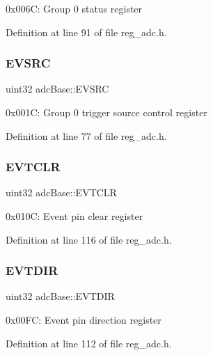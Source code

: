 0x006C\+: Group 0 status register 

Definition at line 91 of file reg\+\_\+adc.\+h.

\mbox{\label{structadcBase_a3887189740f5fcbde31550a5c2097724}} 
\subsubsection{\texorpdfstring{E\+V\+S\+RC}{EVSRC}}
{\footnotesize\ttfamily uint32 adc\+Base\+::\+E\+V\+S\+RC}

0x001C\+: Group 0 trigger source control register 

Definition at line 77 of file reg\+\_\+adc.\+h.

\mbox{\label{structadcBase_a7eea2dced4784e9fcaac90869b2354d9}} 
\subsubsection{\texorpdfstring{E\+V\+T\+C\+LR}{EVTCLR}}
{\footnotesize\ttfamily uint32 adc\+Base\+::\+E\+V\+T\+C\+LR}

0x010C\+: Event pin clear register 

Definition at line 116 of file reg\+\_\+adc.\+h.

\mbox{\label{structadcBase_a73fcd3b437f936e20ca79cdec1e96c8f}} 
\subsubsection{\texorpdfstring{E\+V\+T\+D\+IR}{EVTDIR}}
{\footnotesize\ttfamily uint32 adc\+Base\+::\+E\+V\+T\+D\+IR}

0x00\+FC\+: Event pin direction register 

Definition at line 112 of file reg\+\_\+adc.\+h.

\mbox{\label{structadcBase_a23cf62731bf696d4de974d979b3d4f99}} 
